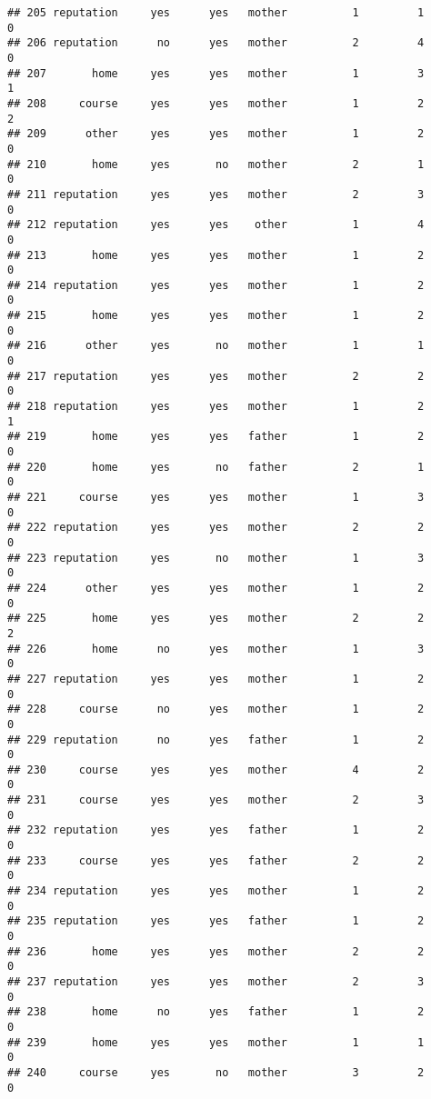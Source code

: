 \documentclass[]{article}
\begin{document}
\begin{verbatim}
## 205 reputation     yes      yes   mother          1         1        0
## 206 reputation      no      yes   mother          2         4        0
## 207       home     yes      yes   mother          1         3        1
## 208     course     yes      yes   mother          1         2        2
## 209      other     yes      yes   mother          1         2        0
## 210       home     yes       no   mother          2         1        0
## 211 reputation     yes      yes   mother          2         3        0
## 212 reputation     yes      yes    other          1         4        0
## 213       home     yes      yes   mother          1         2        0
## 214 reputation     yes      yes   mother          1         2        0
## 215       home     yes      yes   mother          1         2        0
## 216      other     yes       no   mother          1         1        0
## 217 reputation     yes      yes   mother          2         2        0
## 218 reputation     yes      yes   mother          1         2        1
## 219       home     yes      yes   father          1         2        0
## 220       home     yes       no   father          2         1        0
## 221     course     yes      yes   mother          1         3        0
## 222 reputation     yes      yes   mother          2         2        0
## 223 reputation     yes       no   mother          1         3        0
## 224      other     yes      yes   mother          1         2        0
## 225       home     yes      yes   mother          2         2        2
## 226       home      no      yes   mother          1         3        0
## 227 reputation     yes      yes   mother          1         2        0
## 228     course      no      yes   mother          1         2        0
## 229 reputation      no      yes   father          1         2        0
## 230     course     yes      yes   mother          4         2        0
## 231     course     yes      yes   mother          2         3        0
## 232 reputation     yes      yes   father          1         2        0
## 233     course     yes      yes   father          2         2        0
## 234 reputation     yes      yes   mother          1         2        0
## 235 reputation     yes      yes   father          1         2        0
## 236       home     yes      yes   mother          2         2        0
## 237 reputation     yes      yes   mother          2         3        0
## 238       home      no      yes   father          1         2        0
## 239       home     yes      yes   mother          1         1        0
## 240     course     yes       no   mother          3         2        0

\end{verbatim}
\end{document}
